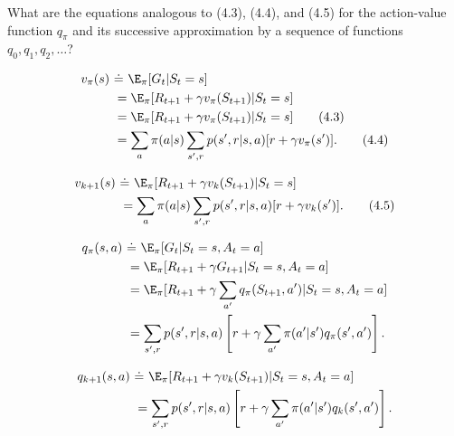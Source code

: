 
\begin{exercise}[Exercise 4.3]

What are the equations analogous to (4.3), (4.4), and (4.5) for the action-value
function $q_\pi$ and its successive approximation by a sequence of functions
$q_0,q_1,q_2,\dots$?

\begin{align}
  v_\pi(s) \ &\dot= \  \E_\pi[G_t | S_t = s] \notag \\
  &= \E_\pi[R_{t+1} + \gamma v_\pi(S_{t+1}) | S_t = s] \notag \\
  &= \E_\pi[R_{t+1} + \gamma v_\pi(S_{t+1}) | S_t = s] \tag{4.3}\label{eq:4.3} \\
  &= \sum_a \pi(a|s) \sum_{s',r} p(s', r|s, a)[r + \gamma v_\pi(s')]. \tag{4.4}\label{eq:4.4}
\end{align}

\begin{align}
  v_{k+1}(s) \ &\dot= \ \E_\pi[R_{t+1} + \gamma v_k(S_{t+1}) | S_t = s] \notag \\
  &= \sum_a \pi(a|s) \sum_{s',r} p(s',r|s,a)[r + \gamma v_k(s')]. \tag{4.5}\label{eq:4.5}
\end{align}

\end{exercise}


\begin{solution}

\begin{align*}
  q_\pi(s,a) \ &\dot= \ \E_\pi[G_t | S_t = s, A_t = a] \\
  &= \E_\pi[R_{t+1} + \gamma G_{t+1} | S_t = s, A_t = a] \\
  &= \E_\pi[R_{t+1} + \gamma \sum_{a'}q_\pi(S_{t+1},a') | S_t = s, A_t = a] \\
  &= \sum_{s',r} p(s',r|s,a)\left[r + \gamma \sum_{a'} \pi(a'|s')q_\pi(s',a')\right].
\end{align*}

\begin{align*}
  q_{k+1}(s,a) \ &\dot= \ \E_\pi[R_{t+1} + \gamma v_k(S_{t+1}) | S_t = s, A_t = a] \\
  &= \sum_{s',r} p(s',r|s,a)\left[r + \gamma \sum_{a'} \pi(a'|s')q_k(s',a')\right].
\end{align*}

\end{solution}

